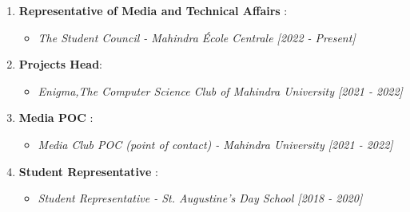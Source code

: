 \documentclass[a4paper, oneside, 12pt]{article}
\begin{document}
\color{black}
\begin{enumerate}[label = , topsep = 0mm, partopsep = 0pt, itemsep = 1mm]
  \item
        \textbf{Representative of Media and Technical Affairs }:
        \begin{itemize}[label = - , topsep = 0mm, partopsep = 0mm]
          \item \textit{The Student Council - Mahindra École Centrale [2022 - Present]}
        \end{itemize}

  \item \textbf{Projects Head}:
        \begin{itemize}[label = - , topsep = 0mm, partopsep = 0mm]
          \item \textit{Enigma,The Computer Science Club of Mahindra University [2021 - 2022]}
        \end{itemize}

  \item
        \textbf{Media POC }:
        \begin{itemize}[label = - , topsep = 0mm, partopsep = 0mm]
          \item \textit{Media Club POC (point of contact) - Mahindra University [2021 - 2022]}
        \end{itemize}

  \item
        \textbf{Student Representative }:
        \begin{itemize}[label = - , topsep = 0mm, partopsep = 0mm]
          \item \textit{Student Representative - St. Augustine's Day School [2018 - 2020]}
        \end{itemize}

\end{enumerate}
\end{document}
